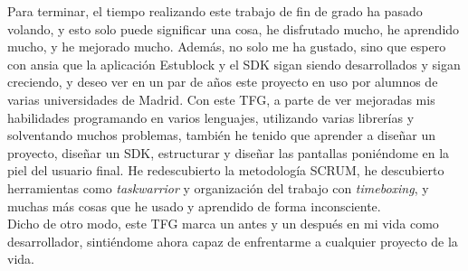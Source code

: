 Para terminar, el tiempo realizando este trabajo de fin de grado ha pasado volando, y esto solo puede significar una cosa, he disfrutado mucho, he aprendido mucho, y he mejorado mucho. Además, no solo me ha gustado, sino que espero con ansia que la aplicación Estublock y el SDK sigan siendo desarrollados y sigan creciendo, y deseo ver en un par de años este proyecto en uso por alumnos de varias universidades de Madrid. Con este TFG, a parte de ver mejoradas mis habilidades programando en varios lenguajes, utilizando varias librerías y solventando muchos problemas, también he tenido que aprender a diseñar un proyecto, diseñar un SDK, estructurar y diseñar las pantallas poniéndome en la piel del usuario final. He redescubierto la metodología SCRUM, he descubierto herramientas como \textit{taskwarrior} y organización del trabajo con \textit{timeboxing}, y muchas más cosas que he usado y aprendido de forma inconsciente. \\

Dicho de otro modo, este TFG marca un antes y un después en mi vida como desarrollador, sintiéndome ahora capaz de enfrentarme a cualquier proyecto de la vida. 
